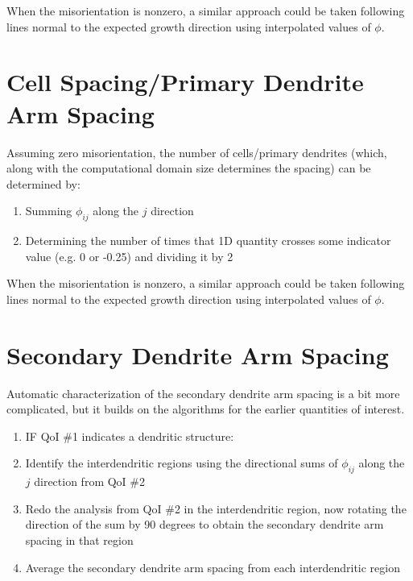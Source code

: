 \documentclass[11pt]{article}
\begin{document}
When the misorientation is nonzero, a similar approach could be taken following lines normal to the expected growth direction using interpolated values of $\phi$. 

\section{Cell Spacing/Primary Dendrite Arm Spacing}
Assuming zero misorientation, the number of cells/primary dendrites (which, along with the computational domain size determines the spacing) can be determined by:
\begin{enumerate}
\item Summing $\phi_{ij}$ along the $j$ direction
\item Determining the number of times that 1D quantity crosses some indicator value (e.g. 0 or -0.25) and dividing it by 2
\end{enumerate}

When the misorientation is nonzero, a similar approach could be taken following lines normal to the expected growth direction using interpolated values of $\phi$. 

\section{Secondary Dendrite Arm Spacing}
Automatic characterization of the secondary dendrite arm spacing is a bit more complicated, but it builds on the algorithms for the earlier quantities of interest.

\begin{enumerate}
\item IF QoI \#1 indicates a dendritic structure:
\item Identify the interdendritic regions using the directional sums of $\phi_{ij}$ along the $j$ direction from QoI \#2
\item Redo the analysis from  QoI \#2 in the interdendritic region, now rotating the direction of the sum by 90 degrees to obtain the secondary dendrite arm spacing in that region
\item Average the secondary dendrite arm spacing from each interdendritic region
\end{enumerate}
\end{document}
